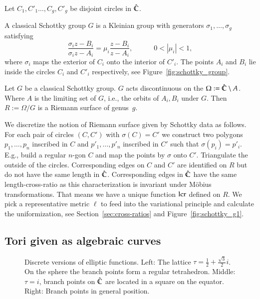 \documentclass[Thesis]{subfiles}
\begin{document}
Let $C_1,C'_1\ldots,C_g,C'_g$ be disjoint circles in $\hat{\mathbb C}$.
\begin{definition} A classical Schottky group $G$ is a Kleinian group with generators $\sigma_1,\ldots,\sigma_g$ satisfying
\begin{equation}
\frac{\sigma_i z - B_i}{\sigma_i z - A_i} = \mu_i \frac{z - B_i}{z - A_i},
\quad\quad\quad 0 < \left|\mu_i\right|<1,
\end{equation}
where $\sigma_i$ maps the exterior of $C_i$ onto the interior of $C'_i$. The points $A_i$ and $B_i$ lie inside the circles $C_i$ and $C'_i$ respectively, see Figure~\ref{fig:schottky_group}.
\end{definition}
Let $G$ be a classical Schottky group. $G$ acts discontinuous on the $\Omega:=\hat{\mathbb C}\setminus A$. 
Where $A$ is the limiting set of $G$, i.e., the orbits of $A_i, B_i$ under $G$.
Then $R:=\Omega/G$ is a Riemann surface of genus~$g$.

We discretize the notion of Riemann surface given by Schottky data as follows.
For each pair of circles $(C, C')$ with $\sigma(C) =C'$ we construct two polygons $p_1,\ldots,p_n$ inscribed in $C$ and $p'_1,\ldots,p'_n$ inscribed in $C'$ such that $\sigma(p_i)=p'_i$. E.g., build a regular $n$-gon $C$ and map the points by $\sigma$ onto $C'$.
Triangulate the outside of the circles.
Corresponding edges on $C$ and $C'$ are identified on $R$ but do not have the same length in $\hat{\mathbb C}$.
Corresponding edges in $\hat{\mathbb C}$ have the same length-cross-ratio as this characterization is invariant under M\"{o}bius transformations.
That means we have a unique function $\operatorname{lcr}$ defined on $R$.
We pick a representative metric $\ell$ to feed into the variational principle and calculate the uniformization, see Section~\ref{sec:cross-ratios} and Figure~\ref{fig:schottky_g1}.

\subsection{Tori given as algebraic curves}
\label{sec:discrete_algebraic_curves}

\begin{figure}
\centering
{}
\caption{Discrete versions of elliptic functions. Left: The lattice $\tau=\frac{1}{2}+\frac{\sqrt 3}{2}i$. On the sphere the branch points form a regular tetrahedron. Middle: $\tau=i$, branch points on $\hat {\mathbb C}$ are located in a square on the equator. Right: Branch points in general position.}
\label{fig:p_functions}
\end{figure}
\end{document}
